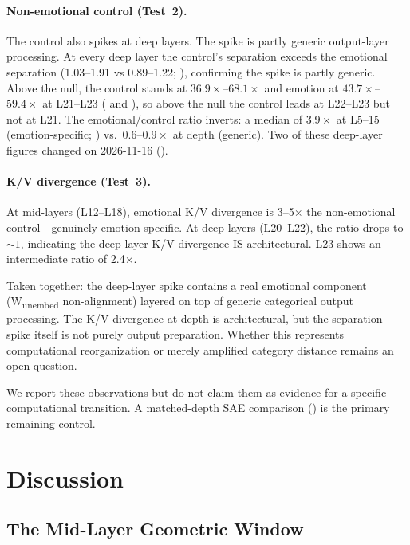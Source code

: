 \documentclass[11pt,a4paper]{article}
\begin{document}
\paragraph{Non-emotional control (Test~2).} The control also spikes at
deep layers. The spike is partly generic output-layer processing.
At every deep layer the control's separation exceeds the emotional
separation (1.03--1.91 vs 0.89--1.22; ), confirming the
spike is partly generic. Above the null, the control stands at
$36.9\times$--$68.1\times$ and emotion at $43.7\times$--$59.4\times$ at
L21--L23 ( and
), so above the null the control
leads at L22--L23 but not at L21. The emotional/control ratio
inverts: a median of $3.9\times$ at L5--15 (emotion-specific;
) vs.\ $0.6$--$0.9\times$ at depth (generic). Two of
these deep-layer figures changed on 2026-11-16 ().

\paragraph{K/V divergence (Test~3).} At mid-layers (L12--L18), emotional
K/V divergence is 3--5$\times$ the non-emotional control---genuinely
emotion-specific. At deep layers (L20--L22), the ratio drops to
${\sim}1$, indicating the deep-layer K/V divergence IS architectural.
L23 shows an intermediate ratio of 2.4$\times$.

Taken together: the deep-layer spike contains a real emotional component
(W\textsubscript{unembed} non-alignment) layered on top of generic
categorical output processing. The K/V
divergence at depth is architectural, but the separation spike itself is
not purely output preparation. Whether this represents computational
reorganization or merely amplified category distance remains an open
question.

We report these observations but do not claim them as evidence for a
specific computational transition. A matched-depth SAE comparison
() is the primary remaining control.

\section{Discussion}
\label{sec:discussion}

\subsection{The Mid-Layer Geometric Window}
\end{document}
